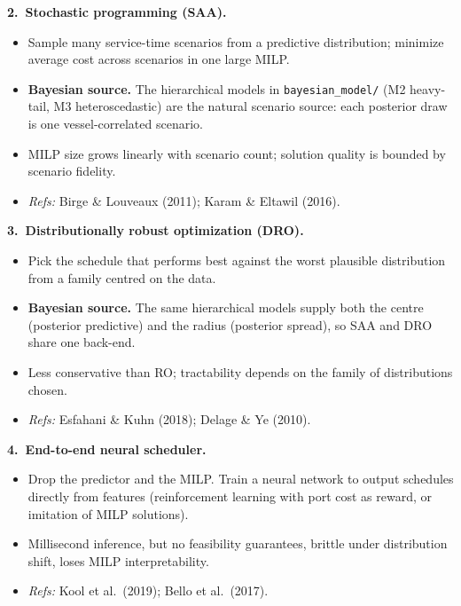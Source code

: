 \documentclass[11pt]{article}
\begin{document}
\vspace{0.4em}

\noindent\textbf{2.\ Stochastic programming (SAA).}
\begin{itemize}[leftmargin=2em, itemsep=0pt]
  \item Sample many service-time scenarios from a predictive
        distribution; minimize average cost across scenarios in one
        large MILP.
  \item \textbf{Bayesian source.} The hierarchical models in
        \texttt{bayesian\_model/} (M2 heavy-tail, M3 heteroscedastic)
        are the natural scenario source: each posterior draw is one
        vessel-correlated scenario.
  \item MILP size grows linearly with scenario count; solution quality
        is bounded by scenario fidelity.
  \item \emph{Refs:} Birge \& Louveaux (2011); Karam \& Eltawil (2016).
\end{itemize}

\vspace{0.4em}

\noindent\textbf{3.\ Distributionally robust optimization (DRO).}
\begin{itemize}[leftmargin=2em, itemsep=0pt]
  \item Pick the schedule that performs best against the worst
        plausible distribution from a family centred on the data.
  \item \textbf{Bayesian source.} The same hierarchical models supply
        both the centre (posterior predictive) and the radius
        (posterior spread), so SAA and DRO share one back-end.
  \item Less conservative than RO; tractability depends on the family
        of distributions chosen.
  \item \emph{Refs:} Esfahani \& Kuhn (2018); Delage \& Ye (2010).
\end{itemize}

\vspace{0.4em}

\noindent\textbf{4.\ End-to-end neural scheduler.}
\begin{itemize}[leftmargin=2em, itemsep=0pt]
  \item Drop the predictor and the MILP. Train a neural network to
        output schedules directly from features (reinforcement
        learning with port cost as reward, or imitation of MILP
        solutions).
  \item Millisecond inference, but no feasibility guarantees, brittle
        under distribution shift, loses MILP interpretability.
  \item \emph{Refs:} Kool et al.\ (2019); Bello et al.\ (2017).
\end{itemize}
\end{document}
